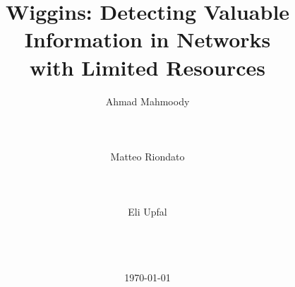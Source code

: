 \documentclass{sig-alternate-2013}
\newif\ifacmstyle
\begin{document}
\ifacmstyle
\newfont{\mycrnotice}{ptmr8t at 7pt}
\newfont{\myconfname}{ptmri8t at 7pt}
\let\crnotice\mycrnotice%
\let\confname\myconfname%

\CopyrightYear{2016}
\permission{Permission to make digital or hard copies of all or part of this
work for personal or classroom use is granted without fee provided that copies
are not made or distributed for profit or commercial advantage and that copies
bear this notice and the full citation on the first page. Copyrights for
components of this work owned by others than ACM must be honored. Abstracting
with credit is permitted. To copy otherwise, or republish, to post on servers or
to redistribute to lists, requires prior specific permission and/or a fee.
Request permissions from Permissions@acm.org.}
\conferenceinfo{WSDM'16,}{February 22--25, 2016, San Francisco, CA, USA}
\copyrightetc{\copyright~2016 ACM. ISBN \the\acmcopyr}
\crdata{XXX-X-XXXX-XXXX-X/16/02\ ...\$15.00.\\
DOI: http://dx.doi.org/XX.XXXX/XXXXXXX.XXXXXXX
}

\clubpenalty=10000
\widowpenalty = 10000
\fi

\title{Wiggins: Detecting Valuable Information in Networks\\with Limited Resources}

\author{
\alignauthor
Ahmad Mahmoody\\
\\
\\
\\
\alignauthor
Matteo Riondato\\
\\
\\
\\
\alignauthor
Eli Upfal\\
\\
\\
\\
}

\date{\today}

\maketitle
\end{document}
